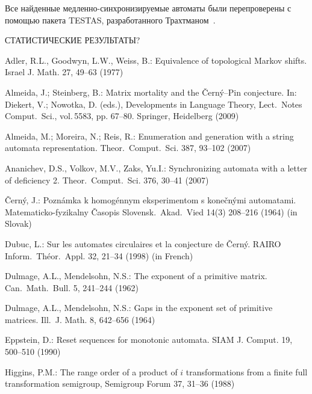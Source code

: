 \documentclass[11pt]{article}
\begin{document}
Все найденные медленно-синхронизируемые автоматы были перепроверены с помощью
пакета TESTAS, разработанного Трахтманом~\cite{Tr06}.



СТАТИСТИЧЕСКИЕ РЕЗУЛЬТАТЫ?


\begin{thebibliography}{99}
Adler, R.L., Goodwyn, L.W., Weiss, B.: Equivalence of topological Markov shifts.
Israel J. Math. 27, 49--63 (1977)

Almeida, J.; Steinberg, B.: Matrix mortality and the \v{C}ern\'{y}--Pin
conjecture. In:  Diekert, V.; Nowotka, D. (eds.), Developments in
Language Theory, Lect.\ Notes Comput.\ Sci., vol.\,5583, pp. 67--80.
Springer, Heidelberg (2009)

Almeida, M.; Moreira, N.; Reis, R.: Enumeration and generation with a string
automata representation. Theor.\ Comput.\ Sci. 387, 93--102 (2007)

Ananichev, D.S., Volkov, M.V., Zaks, Yu.I.: Synchronizing automata
with a letter of deficiency 2. Theor.\ Comput.\ Sci. 376, 30--41 (2007)

\v{C}ern\'{y}, J.: Pozn\'{a}mka k homog\'{e}nnym eksperimentom s
kone\v{c}n\'{y}mi automatami. Matematicko-fyzikalny \v{C}asopis
Slovensk.\ Akad.\ Vied 14(3) 208--216 (1964) (in Slovak)

Dubuc, L.: Sur les automates circulaires et la conjecture de
\v{C}ern\'y. RAIRO Inform.\ Th\'eor.\ Appl. 32, 21--34 (1998) (in
French)

Dulmage, A.L., Mendelsohn, N.S.: The exponent of a primitive matrix.
Can.\ Math.\ Bull. 5, 241--244 (1962)

Dulmage, A.L., Mendelsohn, N.S.: Gaps in the exponent set of primitive
matrices. Ill.\ J. Math. 8, 642--656 (1964)

Eppstein, D.: Reset sequences for monotonic automata. SIAM J.
Comput. 19, 500--510 (1990)

Higgins, P.M.: The range order of a product of $i$ transformations
from a finite full transformation semigroup, Semigroup Forum 37, 31--36
(1988)


\end{thebibliography}
\end{document}
